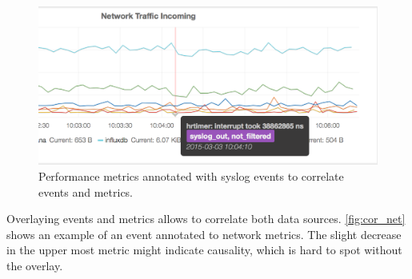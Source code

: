 \begin{figure}[!ht]
    \includegraphics[width=.4\textwidth]{images/png/combined_perf.png}
    \caption{\label{fig:cor_net}Performance metrics annotated with syslog events to correlate events and metrics.}
\end{figure}
Overlaying events and metrics allows to correlate both data sources. \autoref{fig:cor_net} shows an example of an event annotated to network metrics. The slight decrease in the upper most metric might indicate causality, which is hard to spot without the overlay.